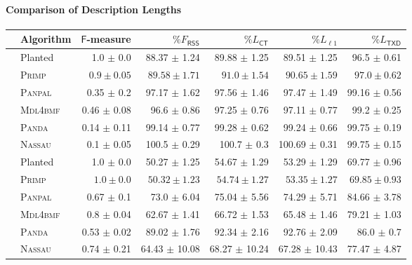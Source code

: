 \paragraph{Comparison of Description Lengths}
\begin{table}%
	\centering
    \begin{adjustbox}{max width=\textwidth}
	\begin{tabular}{clrrrrr}\toprule
 & Algorithm & $\mathsf{F}$-measure & $\%F_{\mathsf{RSS}}$ & $\%L_{\mathsf{CT}}$ & $\%L_{\ell 1}$  & $\%L_{\mathsf{TXD}}$  \\ \midrule
 \rowcolor{black!10}
\multirow{6}{*}{\cellcolor{white}\rotatebox{90}{ $p_\pm=25\%$ }  } 
&Planted& 1.0 $\pm$ 0.0 & 88.37 $\pm$ 1.24 & 89.88 $\pm$ 1.25 & 89.51 $\pm$ 1.25 & 96.5 $\pm$ 0.61\\
 & \textsc{Primp} & $\mathbf{0.9\pm0.05}$ & $\mathbf{89.58\pm1.71}$ & $\mathbf{91.0\pm1.54}$ & $\mathbf{90.65\pm1.59}$ & $\mathbf{97.0\pm0.62}$\\
 & \textsc{Panpal} & 0.35 $\pm$ 0.2 & 97.17 $\pm$ 1.62 & 97.56 $\pm$ 1.46 & 97.47 $\pm$ 1.49 & 99.16 $\pm$ 0.56\\
 & \textsc{Mdl4bmf} & 0.46 $\pm$ 0.08 & 96.6 $\pm$ 0.86 & 97.25 $\pm$ 0.76 & 97.11 $\pm$ 0.77 & 99.2 $\pm$ 0.25\\
 & \textsc{Panda} & 0.14 $\pm$ 0.11 & 99.14 $\pm$ 0.77 & 99.28 $\pm$ 0.62 & 99.24 $\pm$ 0.66 & 99.75 $\pm$ 0.19\\
 & \textsc{Nassau} & 0.1 $\pm$ 0.05 & 100.5 $\pm$ 0.29 & 100.7 $\pm$ 0.3 & 100.69 $\pm$ 0.31 & 99.75 $\pm$ 0.15\\
 \midrule
\rowcolor{black!10}
\multirow{6}{*}{\cellcolor{white}\rotatebox{90}{ $r^* = 45$ }  }  
& Planted & 1.0 $\pm$ 0.0 &  50.27 $\pm$ 1.25 & 54.67 $\pm$ 1.29 & 53.29 $\pm$ 1.29 & 69.77 $\pm$ 0.96\\
 & \textsc{Primp} & $\mathbf{1.0\pm0.0}$ & $\mathbf{50.32\pm1.23}$ & $\mathbf{54.74\pm1.27}$ & $\mathbf{53.35\pm1.27}$ & $\mathbf{69.85\pm0.93}$\\
 & \textsc{Panpal} & 0.67 $\pm$ 0.1 & 73.0 $\pm$ 6.04 & 75.04 $\pm$ 5.56 & 74.29 $\pm$ 5.71 & 84.66 $\pm$ 3.78\\
 & \textsc{Mdl4bmf} & 0.8 $\pm$ 0.04 & 62.67 $\pm$ 1.41 & 66.72 $\pm$ 1.53 & 65.48 $\pm$ 1.46 & 79.21 $\pm$ 1.03\\
 & \textsc{Panda} & 0.53 $\pm$ 0.02 & 89.02 $\pm$ 1.76 & 92.34 $\pm$ 2.16 & 92.76 $\pm$ 2.09 & 86.0 $\pm$ 0.7\\
 & \textsc{Nassau} & 0.74 $\pm$ 0.21 & 64.43 $\pm$ 10.08 & 68.27 $\pm$ 10.24 & 67.28 $\pm$ 10.43 & 77.47 $\pm$ 4.87\\ \midrule

\end{tabular}
\end{adjustbox}
\end{table}
